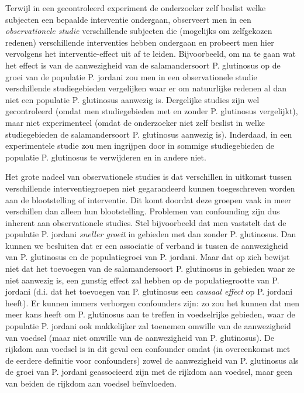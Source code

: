 \documentclass[
  12pt,dutch,coursenotes]{book}
\begin{document}
Terwijl in een gecontroleerd experiment de onderzoeker zelf beslist
welke subjecten een bepaalde interventie ondergaan, observeert men
in een \emph{observationele studie} verschillende subjecten die (mogelijks om zelfgekozen redenen) verschillende interventies hebben ondergaan en probeert men hier vervolgens het interventie-effect uit af te leiden. Bijvoorbeeld, om na te gaan wat het effect is van de aanwezigheid van de salamandersoort P. glutinosus op de groei van de populatie P. jordani zou men in een observationele studie verschillende studiegebieden vergelijken waar er om natuurlijke redenen al dan niet een populatie P. glutinosus aanwezig is. Dergelijke studies
zijn wel gecontroleerd (omdat men studiegebieden met en zonder P. glutinosus vergelijkt), maar niet experimenteel (omdat de
onderzoeker niet zelf beslist in welke studiegebieden de salamandersoort P. glutinosus aanwezig is). Inderdaad, in een experimentele studie zou men ingrijpen door in sommige studiegebieden de populatie P. glutinosus te verwijderen en in andere niet.

Het grote nadeel van observationele studies is dat verschillen in uitkomst
tussen verschillende interventiegroepen niet gegarandeerd kunnen
toegeschreven worden aan de blootstelling of interventie. Dit komt doordat deze groepen
vaak in meer verschillen dan alleen hun blootstelling. Problemen van
confounding zijn dus inherent aan observationele studies. Stel bijvoorbeeld
dat men vaststelt dat de populatie P. jordani \emph{sneller groeit} in gebieden met
dan zonder P. glutinosus. Dan kunnen we besluiten dat
er een associatie of verband is tussen de aanwezigheid van P. glutinosus en de populatiegroei van P. jordani. Maar dat op zich
bewijst niet dat het toevoegen van de salamandersoort P. glutinosus in gebieden waar ze niet aanwezig is, een gunstig effect zal hebben op de populatiegrootte van P. jordani (d.i. dat het toevoegen van P. glutinosus een \emph{causaal effect} op P. jordani heeft). Er kunnen immers verborgen confounders zijn: zo zou het kunnen dat men meer kans heeft om P. glutinosus aan te treffen in voedselrijke gebieden, waar de populatie P. jordani ook makkelijker zal toenemen omwille van de aanwezigheid van voedsel (maar niet omwille van de aanwezigheid van P. glutinosus).
De rijkdom aan voedsel is in dit geval
een confounder omdat (in overeenkomst met de eerdere definitie voor
confounders) zowel de aanwezigheid van P. glutinosus als de groei van P. jordani
geassocieerd zijn met de rijkdom aan voedsel, maar geen van beiden de rijkdom aan voedsel beïnvloeden.
\end{document}
